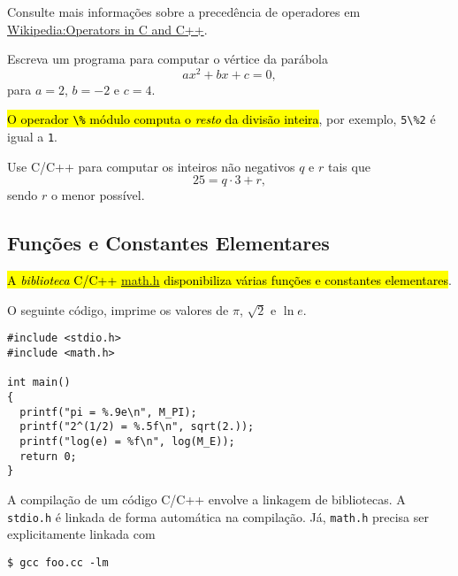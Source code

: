 \documentclass[12pt]{article}
\begin{document}
\begin{obs}
Consulte mais informações sobre a precedência de operadores em \href{https://en.wikipedia.org/wiki/Operators_in_C_and_C\%2B\%2B#Operator_precedence}{Wikipedia:Operators in C and C++}.
\end{obs}

\begin{exr}
  Escreva um programa para computar o vértice da parábola
  \begin{equation}
    ax^2 + bx + c = 0,
  \end{equation}
  para $a = 2$, $b = -2$ e $c = 4$. 
\end{exr}

\hl{O operador {\lstinline+\%+} módulo computa o \emph{resto} da divisão inteira}, por exemplo, \lstinline+5\%2+ é igual a \lstinline+1+.

\begin{exr}
  Use C/C++ para computar os inteiros não negativos $q$ e $r$ tais que
  \begin{equation}
    25 = q\cdot 3 + r,
  \end{equation}
  sendo $r$ o menor possível.
\end{exr}

\subsection{Funções e Constantes Elementares}

\hl{A \emph{biblioteca} C/C++ {\href{https://cplusplus.com/reference/cmath}{math.h}} disponibiliza várias funções e constantes elementares}.


\begin{ex}
  O seguinte código, imprime os valores de $\pi$, $\sqrt{2}$ e $\ln e$.
\begin{lstlisting}[caption=mat.cc]
#include <stdio.h>
#include <math.h>

int main()
{
  printf("pi = %.9e\n", M_PI);
  printf("2^(1/2) = %.5f\n", sqrt(2.));
  printf("log(e) = %f\n", log(M_E));
  return 0;
}
\end{lstlisting}
\end{ex}

\begin{obs}
  A compilação de um código C/C++ envolve a linkagem de bibliotecas. A \lstinline!stdio.h! é linkada de forma automática na compilação. Já, \lstinline!math.h! precisa ser explicitamente linkada com
\begin{lstlisting}
$ gcc foo.cc -lm
\end{lstlisting}
\end{obs}
\end{document}
